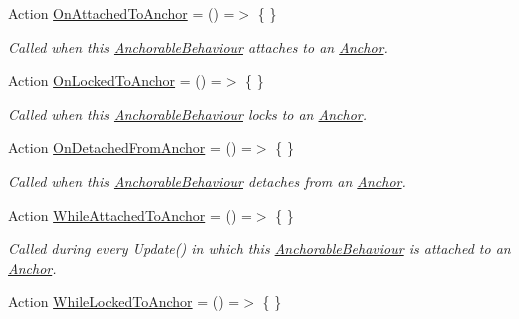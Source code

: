 \begin{DoxyCompactItemize}
\item 
Action \mbox{\hyperlink{class_leap_1_1_unity_1_1_interaction_1_1_anchorable_behaviour_a6fbe787555ba1bcbae45f715777e0b7d}{On\+Attached\+To\+Anchor}} = () =$>$ \{ \}
\begin{DoxyCompactList}\small\item\em Called when this \mbox{\hyperlink{class_leap_1_1_unity_1_1_interaction_1_1_anchorable_behaviour}{Anchorable\+Behaviour}} attaches to an \mbox{\hyperlink{class_leap_1_1_unity_1_1_interaction_1_1_anchor}{Anchor}}. \end{DoxyCompactList}\item 
Action \mbox{\hyperlink{class_leap_1_1_unity_1_1_interaction_1_1_anchorable_behaviour_a03147adbeb35c85e8bded5c70a266f5d}{On\+Locked\+To\+Anchor}} = () =$>$ \{ \}
\begin{DoxyCompactList}\small\item\em Called when this \mbox{\hyperlink{class_leap_1_1_unity_1_1_interaction_1_1_anchorable_behaviour}{Anchorable\+Behaviour}} locks to an \mbox{\hyperlink{class_leap_1_1_unity_1_1_interaction_1_1_anchor}{Anchor}}. \end{DoxyCompactList}\item 
Action \mbox{\hyperlink{class_leap_1_1_unity_1_1_interaction_1_1_anchorable_behaviour_a61aec444eb2b020981d37d7a15c1b280}{On\+Detached\+From\+Anchor}} = () =$>$ \{ \}
\begin{DoxyCompactList}\small\item\em Called when this \mbox{\hyperlink{class_leap_1_1_unity_1_1_interaction_1_1_anchorable_behaviour}{Anchorable\+Behaviour}} detaches from an \mbox{\hyperlink{class_leap_1_1_unity_1_1_interaction_1_1_anchor}{Anchor}}. \end{DoxyCompactList}\item 
Action \mbox{\hyperlink{class_leap_1_1_unity_1_1_interaction_1_1_anchorable_behaviour_aaf482a8b7ddc06ccae2435b20e211c32}{While\+Attached\+To\+Anchor}} = () =$>$ \{ \}
\begin{DoxyCompactList}\small\item\em Called during every Update() in which this \mbox{\hyperlink{class_leap_1_1_unity_1_1_interaction_1_1_anchorable_behaviour}{Anchorable\+Behaviour}} is attached to an \mbox{\hyperlink{class_leap_1_1_unity_1_1_interaction_1_1_anchor}{Anchor}}. \end{DoxyCompactList}\item 
Action \mbox{\hyperlink{class_leap_1_1_unity_1_1_interaction_1_1_anchorable_behaviour_ae28b784351149af7a30d9079820c1a35}{While\+Locked\+To\+Anchor}} = () =$>$ \{ \}

\end{DoxyCompactItemize}
